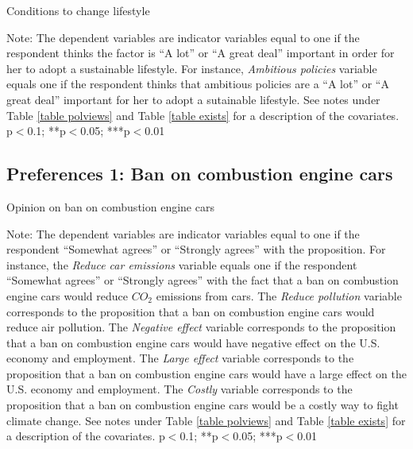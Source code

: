 \documentclass{article}
\begin{document}
\begin{landscape}
	\begin{table}[h!]
		\caption{Conditions to change lifestyle}
		\begin{center}
			\scalebox{0.5}{}
		\end{center}
	{\footnotesize Note: The dependent variables are indicator variables equal to one if the respondent thinks the factor is ``A lot'' or ``A great deal'' important in order for her to adopt a sustainable lifestyle. For instance, \textit{Ambitious policies} variable equals one if the respondent thinks that ambitious policies are a ``A lot'' or ``A great deal'' important for her to adopt a sutainable lifestyle. See notes under Table \ref{table polviews} and Table \ref{table exists} for a description of the covariates.
	\newline *p$<$0.1; **p$<$0.05; ***p$<$0.01}
	\end{table}		
\end{landscape}



\clearpage
\subsection{Preferences 1: Ban on combustion engine cars}



\begin{table}[h!]
	\caption{Opinion on ban on combustion engine cars} \label{table standard opinion}
	\begin{center}
		\scalebox{0.7}{}
	\end{center}
	{\footnotesize Note: The dependent variables are indicator variables equal to one if the respondent ``Somewhat agrees'' or ``Strongly agrees'' with the proposition. For instance, the \textit{Reduce car emissions} variable equals one if the respondent ``Somewhat agrees'' or ``Strongly agrees'' with the fact that a ban on combustion engine cars would reduce $CO_2$ emissions from cars. The \textit{Reduce pollution} variable corresponds to the proposition that a ban on combustion engine cars would reduce air pollution. The \textit{Negative effect} variable corresponds to the proposition that a ban on combustion engine cars would have negative effect on the U.S. economy and employment. The \textit{Large effect} variable corresponds to the proposition that a ban on combustion engine cars would have a large effect on the U.S. economy and employment. The \textit{Costly} variable corresponds to the proposition that a ban on combustion engine cars would be a costly way to fight climate change. See notes under Table \ref{table polviews} and Table \ref{table exists} for a description of the covariates.
	\newline *p$<$0.1; **p$<$0.05; ***p$<$0.01}
\end{table}	
\end{document}
